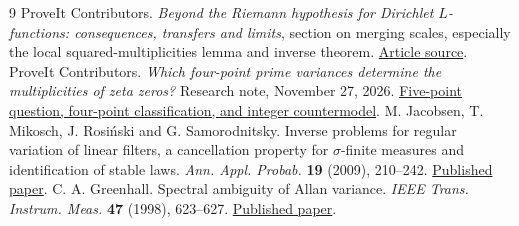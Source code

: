 \documentclass[11pt,letterpaper]{article}
\theoremstyle{definition}
\begin{document}
\begin{thebibliography}{9}
 ProveIt Contributors. \emph{Beyond the Riemann hypothesis for Dirichlet $L$-functions: consequences, transfers and limits}, section on merging scales, especially the local squared-multiplicities lemma and inverse theorem. \href{https://github.com/VladimirReshetnikov/ProveIt/blob/00cadb961bbe77c74e5d082c4948f8884d58a970/Analysis/GeneralizedRiemannHypothesis/Article/sections/zer.tex}{Article source}.
 ProveIt Contributors. \emph{Which four-point prime variances determine the multiplicities of zeta zeros?} Research note, November 27, 2026. \href{https://github.com/VladimirReshetnikov/ProveIt/tree/00cadb961bbe77c74e5d082c4948f8884d58a970/Analysis/GeneralizedRiemannHypothesis/Research/grh-two-open-questions/zero-stencils}{Five-point question, four-point classification, and integer countermodel}.
 M. Jacobsen, T. Mikosch, J. Rosi\'nski and G. Samorodnitsky. Inverse problems for regular variation of linear filters, a cancellation property for $\sigma$-finite measures and identification of stable laws. \emph{Ann. Appl. Probab.} \textbf{19} (2009), 210--242. \href{https://doi.org/10.1214/08-AAP540}{Published paper}.
 C. A. Greenhall. Spectral ambiguity of Allan variance. \emph{IEEE Trans. Instrum. Meas.} \textbf{47} (1998), 623--627. \href{https://doi.org/10.1109/19.744312}{Published paper}.
\end{thebibliography}
\end{document}
